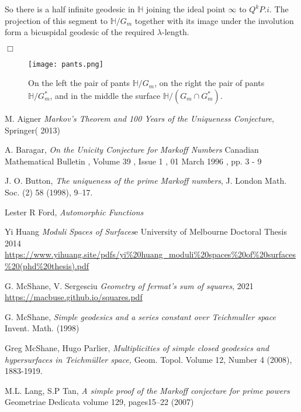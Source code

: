 \documentclass[12pt,a4paper]{amsart}
\def\HH{\mathbb{H}}
\def\GG{G_m}
\begin{document}
So there is a half infinite geodesic in $\HH$ joining the ideal point $\infty$
to $Q^kP.i$. The projection of this segment to $\HH/\GG$ together with its image
under the involution form a bicuspidal geodesic of the required
$\lambda$-length.

\hfill$\Box$


\begin{figure}[ht]
\begin{center}
\texttt{[image: pants.png]}
\end{center}
\caption{On the left the pair of pants $\HH/\GG$,
	on the right  the pair of pants $\HH/\GG^*$,
and in the middle the surface $\HH/(\GG\cap \GG^*)$.}
\label{fig: pants}
\end{figure}


M. Aigner
\textit{Markov's Theorem and 100 Years of the Uniqueness Conjecture}, Springer( 2013)


A. Baragar,
\textit{On the Unicity Conjecture for Markoff Numbers}
Canadian Mathematical Bulletin , Volume 39 , Issue 1 , 01 March 1996 , pp. 3 - 9

J. O. Button, 
\textit{The uniqueness of the prime Markoff numbers},
 J. London Math. Soc.
(2) 58 (1998), 9–17.



Lester R Ford,
\textit{Automorphic Functions}

Yi Huang
\textit{Moduli Spaces of Surfaces}e University of Melbourne Doctoral Thesis 2014
\url{https://www.yihuang.site/pdfs/yi%20huang_moduli%20spaces%20of%20surfaces%20(phd%20thesis).pdf}

G. McShane, V. Sergesciu
\textit{Geometry of fermat’s sum of squares}, 2021 
\url{https://macbuse.github.io/squares.pdf}

G. McShane,
\textit{Simple geodesics and a series constant over Teichmuller space}
Invent. Math. (1998)

Greg McShane, Hugo Parlier,
\textit{Multiplicities of simple closed geodesics and hypersurfaces in Teichmüller space,}
Geom. Topol.
Volume 12, Number 4 (2008), 1883-1919.

M.L. Lang, S.P Tan,
\textit{A simple proof of the Markoff conjecture for prime powers}
Geometriae Dedicata volume 129, pages15–22 (2007)
\end{document}
